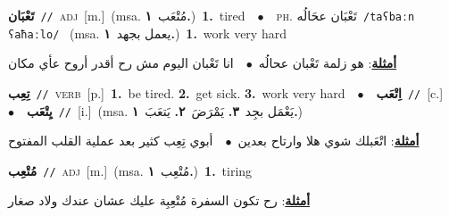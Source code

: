\documentclass[10pt,a4paper,twoside]{article} %
\begin{document}
\begin{multicols}{2}
{\setlength\topsep{0pt}\textbf{\foreignlanguage{arabic}{تَعْبَان}}\ {\color{gray}\texttt{//}\color{black}}\ \textsc{adj}\ [m.]\ \color{gray}(msa. \foreignlanguage{arabic}{مُتْعَب}~\foreignlanguage{arabic}{\textbf{١.}})\color{black}\ \textbf{1.}~tired\ \ $\bullet$\ \ \textsc{ph.} \color{gray} \foreignlanguage{arabic}{تَعْبَان عحَالُه}\color{black}\ {\color{gray}\texttt{/{\sffamily taʕbaːn ʕaħaːlo}/}\color{black}}\ \color{gray} (msa. \foreignlanguage{arabic}{يعمل بجهد}~\foreignlanguage{arabic}{\textbf{١.}})\color{black}\ \textbf{1.}~work very hard\  \begin{flushright}\color{gray}\foreignlanguage{arabic}{\textbf{\underline{\foreignlanguage{arabic}{أمثلة}}}: هو زلمة تَعْبان عحالُه\ $\bullet$\ \  انا تَعْبان اليوم مش رح أقدر أروح عأي مكان}\end{flushright}\color{black}} \vspace{2mm}

{\setlength\topsep{0pt}\textbf{\foreignlanguage{arabic}{تِعِب}}\ {\color{gray}\texttt{//}\color{black}}\ \textsc{verb}\ [p.]\ \textbf{1.}~be tired.  \textbf{2.}~get sick.  \textbf{3.}~work very hard\ \ $\bullet$\ \ \setlength\topsep{0pt}\textbf{\foreignlanguage{arabic}{اِتْعَب}}\ {\color{gray}\texttt{//}\color{black}}\ [c.]\ \ $\bullet$\ \ \setlength\topsep{0pt}\textbf{\foreignlanguage{arabic}{يِتْعَب}}\ {\color{gray}\texttt{//}\color{black}}\ [i.]\ \color{gray}(msa. \foreignlanguage{arabic}{يَعْمَل بجِد}~\foreignlanguage{arabic}{\textbf{٣.}}  \foreignlanguage{arabic}{يَمْرَضَ}~\foreignlanguage{arabic}{\textbf{٢.}}  \foreignlanguage{arabic}{يَتعَبَ}~\foreignlanguage{arabic}{\textbf{١.}})\color{black}\  \begin{flushright}\color{gray}\foreignlanguage{arabic}{\textbf{\underline{\foreignlanguage{arabic}{أمثلة}}}: اتْعَبلك شوي هلا وارتاح بعدين\ $\bullet$\ \  أبوي تِعِب كثير بعد عملية القلب المفتوح}\end{flushright}\color{black}} \vspace{2mm}

{\setlength\topsep{0pt}\textbf{\foreignlanguage{arabic}{مُتْعِب}}\ {\color{gray}\texttt{//}\color{black}}\ \textsc{adj}\ [m.]\ \color{gray}(msa. \foreignlanguage{arabic}{مُتْعِب}~\foreignlanguage{arabic}{\textbf{١.}})\color{black}\ \textbf{1.}~tiring\  \begin{flushright}\color{gray}\foreignlanguage{arabic}{\textbf{\underline{\foreignlanguage{arabic}{أمثلة}}}: رح تكون السفرة مُتْعِبِة عليك عشان عندك ولاد صغار}\end{flushright}\color{black}} \vspace{2mm}


\end{multicols}
\end{document}
